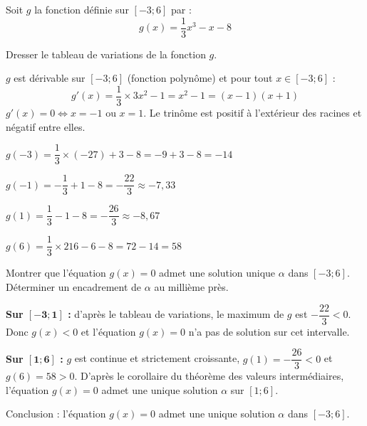 \documentclass[11pt,a4paper]{article}  %
\begin{document}
	\exerciceDS{}
	
	Soit $g$ la fonction définie sur $[-3 ; 6]$ par :
	$$
	g(x)=\frac{1}{3} x^3-x-8
	$$
	
	\begin{enumMet}
		\item Dresser le tableau de variations de la fonction $g$.
		
		\begin{corrBox}
			$g$ est dérivable sur $[-3;6]$ (fonction polynôme) et pour tout $x\in[-3;6]$ :
			\[g'(x)=\dfrac{1}{3}\times 3x^2-1=x^2-1=(x-1)(x+1)\]
			$g'(x)=0 \iff x=-1$ ou $x=1$. Le trinôme est positif à l'extérieur des racines et négatif entre elles.
			
			$g(-3)=\dfrac{1}{3}\times(-27)+3-8=-9+3-8=-14$
			
			$g(-1)=-\dfrac{1}{3}+1-8=-\dfrac{22}{3}\approx-7{,}33$
			
			$g(1)=\dfrac{1}{3}-1-8=-\dfrac{26}{3}\approx-8{,}67$
			
			$g(6)=\dfrac{1}{3}\times216-6-8=72-14=58$
			
			\begin{center}
			\end{center}
		\end{corrBox}
		
		\item Montrer que l'équation $g(x)=0$ admet une solution unique $\alpha$ dans $[-3 ; 6]$. Déterminer un encadrement de $\alpha$ au millième près.
		
		\begin{corrBox}
			\textbf{Sur $\bm{[-3;1]}$ :} d'après le tableau de variations, le maximum de $g$ est $-\dfrac{22}{3}<0$. Donc $g(x)<0$ et l'équation $g(x)=0$ n'a pas de solution sur cet intervalle.
			
			\textbf{Sur $\bm{[1;6]}$ :} $g$ est continue et strictement croissante, $g(1)=-\dfrac{26}{3}<0$ et $g(6)=58>0$. D'après le corollaire du théorème des valeurs intermédiaires, l'équation $g(x)=0$ admet une unique solution $\alpha$ sur $[1;6]$.
			
			Conclusion : l'équation $g(x)=0$ admet une unique solution $\alpha$ dans $[-3;6]$.
			

\end{corrBox}
\end{enumMet}
\end{document}
